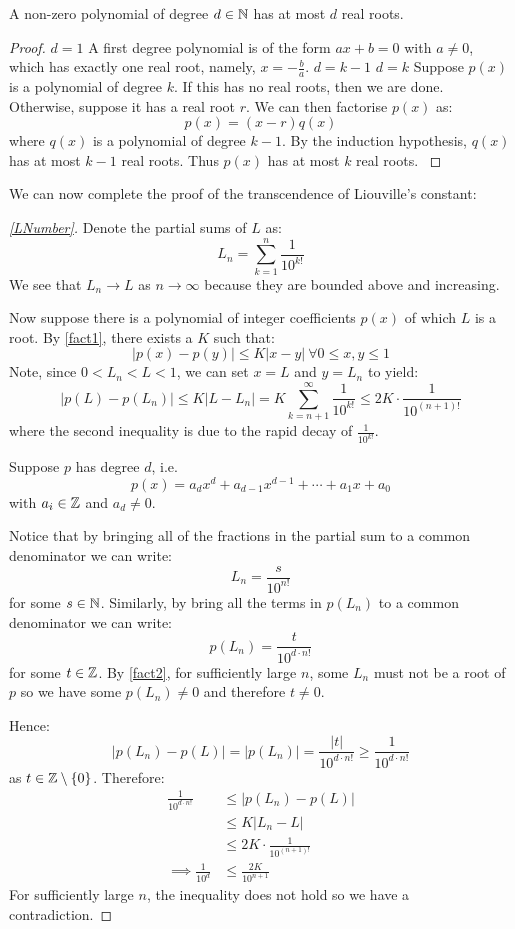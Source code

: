\documentclass[../main.tex]{subfiles}
\begin{document}
\begin{lemma}
  A non-zero polynomial of degree $d \in \mathbb{N}$ has at most $d$ real roots. \label{fact2}
\end{lemma}
\begin{proof}
  \induction
  {$d = 1$}{
    A first degree polynomial is of the form $ax + b = 0$ with $a \neq 0$, which has exactly one real root, namely, $x = -\frac{b}{a}$.
  }
  {$d = k - 1$}{}
  {$d = k$}{
    Suppose $p(x)$ is a polynomial of degree $k$.
    If this has no real roots, then we are done.
    Otherwise, suppose it has a real root $r$.
    We can then factorise $p(x)$ as:
    \[
      p(x) = (x- r)q(x)
    \]
    where $q(x)$ is a polynomial of degree $k - 1$.
    By the induction hypothesis, $q(x)$ has at most $k - 1$  real roots.
    Thus $p(x)$ has at most $k$ real roots.
  }
\end{proof}
We can now complete the proof of the transcendence of Liouville's constant:
\begin{proof}[\cref{LNumber}]
  Denote the partial sums of $L$ as:
  \[
    L_n = \sum_{k = 1}^{n} \frac{1}{10^{k!}}
  \]
  We see that $L_n \to L$ as $n \to \infty$ because they are bounded above and increasing.

  Now suppose there is a polynomial of integer coefficients $p(x)$ of which $L$ is a root.
  By \cref{fact1}, there exists a $K$ such that:
  \[
    |p(x) - p(y)| \leq K|x - y|\ \forall 0 \leq x, y \leq 1
  \]
  Note, since $0 < L_n < L < 1$, we can set $x = L$ and $y = L_n$ to yield:
  \[
    |p(L) - p(L_n)| \leq K|L - L_n| = K\sum_{k = n + 1}^{\infty} \frac{1}{10^{k!}} \leq 2K \cdot \frac{1}{10^{(n + 1)!}}
  \]
where the second inequality is due to the rapid decay of $\frac{1}{10^{k!}}$.

  Suppose $p$ has degree $d$, i.e.
  \[
    p(x) = a_d x^{d} + a_{d-1} x^{d - 1} + \cdots + a_1 x + a_0
  \]
  with $a_i \in \mathbb{Z}$ and $a_d \neq 0$.

  Notice that by bringing all of the fractions in the partial sum to a common denominator we can write:
  \[
    L_n = \frac{s}{10^{n!}}
  \]
  for some $s \in \mathbb{N}$.
  Similarly, by bring all the terms in $p(L_n)$ to a common denominator we can write:
  \[
    p(L_n) = \frac{t}{10^{d \cdot n!}}
  \]
  for some $t \in \mathbb{Z}$.
  By \cref{fact2}, for sufficiently large $n$, some $L_n$ must not be a root of $p$ so we have some $p(L_n) \neq 0$ and therefore $t\neq0$.

  Hence:
  \[
    |p(L_n) - p(L)| = |p(L_n)| = \frac{|t|}{10^{d \cdot n!}} \geq \frac{1}{10^{d \cdot n!}}
  \]
  as $t \in \mathbb{Z} \setminus \{0\}$.
  Therefore:
  \begin{align*}
    \frac{1}{10^{d \cdot n!}} &\leq |p(L_n) - p(L)| \\
                              &\leq K|L_n - L| \\
                              &\leq 2K \cdot \frac{1}{10^{(n + 1)!}} \\
    \implies \frac{1}{10^{d}} &\leq \frac{2K}{10^{n + 1}}
  \end{align*}
  For sufficiently large $n$, the inequality does not hold so we have a contradiction.
\end{proof}
\end{document}
